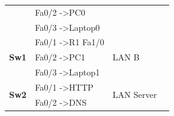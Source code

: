 \documentclass[11pt,a4paper]{report}
\begin{document}
\begin{table}[]
\begin{center}
\begin{tabular}{@{}llllll@{}}
                                                   & Fa0/2 -\textgreater   PC0                                &                                                       & \multicolumn{3}{c}{}                                                                                                                                                 \\ \cmidrule(lr){2-2}
                                                   & Fa0/3 -\textgreater   Laptop0                            &                                                       & \multicolumn{3}{c}{}                                                                                                                                                 \\ \cmidrule(r){1-3}
\multirow{3}{*}{\textbf{Sw1}}                      & Fa0/1 -\textgreater R1 Fa1/0                             & \multirow{3}{*}{LAN B}                                & \multicolumn{3}{c}{}                                                                                                                                                 \\ \cmidrule(lr){2-2}
                                                   & Fa0/2 -\textgreater   PC1                                &                                                       & \multicolumn{3}{c}{}                                                                                                                                                 \\ \cmidrule(lr){2-2}
                                                   & Fa0/3 -\textgreater   Laptop1                            &                                                       & \multicolumn{3}{c}{}                                                                                                                                                 \\ \cmidrule(r){1-3}
\multirow{4}{*}{\textbf{Sw2}}                      & Fa0/1 -\textgreater HTTP                                 & \multirow{4}{*}{LAN Server}                           & \multicolumn{3}{c}{}                                                                                                                                                 \\ \cmidrule(lr){2-2}
                                                   & Fa0/2 -\textgreater   DNS                                &                                                       & \multicolumn{3}{c}{}                                                                                                                                                 \\ \cmidrule(lr){2-2}

\end{tabular}
\end{center}
\end{table}
\end{document}
